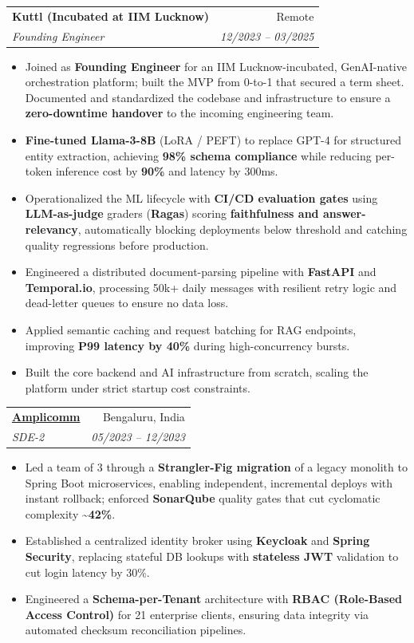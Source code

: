 \documentclass[11pt,a4paper]{article}
\makeatletter
\newcommand{\resumeItem}[1]{
  \item\small{
    {#1 \vspace{-2pt}}
  }
}
\newcommand{\resumeSubheading}[4]{
  \vspace{-1pt}\item
    \begin{tabular*}{0.97\textwidth}[t]{l@{\extracolsep{\fill}}r}
      \textbf{#1} & #2 \\
      \textit{\small#3} & \textit{\small #4} \\
    \end{tabular*}\vspace{-5pt}
}
\newcommand{\resumeItemListStart}{\begin{itemize}[itemsep=2pt, topsep=0pt, partopsep=0pt]}
\newcommand{\resumeItemListEnd}{\end{itemize}\vspace{-5pt}}
\makeatother
\begin{document}
    \resumeSubheading
      {Kuttl (Incubated at IIM Lucknow)}{Remote}
      {Founding Engineer}{12/2023 -- 03/2025}
      \resumeItemListStart
        \resumeItem{Joined as \textbf{Founding Engineer} for an IIM Lucknow-incubated, GenAI-native orchestration platform; built the MVP from 0-to-1 that secured a term sheet. Documented and standardized the codebase and infrastructure to ensure a \textbf{zero-downtime handover} to the incoming engineering team.}
        \resumeItem{\textbf{Fine-tuned Llama-3-8B} (LoRA / PEFT) to replace GPT-4 for structured entity extraction, achieving \textbf{98\% schema compliance} while reducing per-token inference cost by \textbf{90\%} and latency by 300ms.}
        \resumeItem{Operationalized the ML lifecycle with \textbf{CI/CD evaluation gates} using \textbf{LLM-as-judge} graders (\textbf{Ragas}) scoring \textbf{faithfulness and answer-relevancy}, automatically blocking deployments below threshold and catching quality regressions before production.}
        \resumeItem{Engineered a distributed document-parsing pipeline with \textbf{FastAPI} and \textbf{Temporal.io}, processing 50k+ daily messages with resilient retry logic and dead-letter queues to ensure no data loss.}
        \resumeItem{Applied semantic caching and request batching for RAG endpoints, improving \textbf{P99 latency by 40\%} during high-concurrency bursts.}
        \resumeItem{Built the core backend and AI infrastructure from scratch, scaling the platform under strict startup cost constraints.}
      \resumeItemListEnd

    \resumeSubheading
      {\href{https://amplicomm.com/}{Amplicomm}}{Bengaluru, India}
      {SDE-2}{05/2023 -- 12/2023}
      \resumeItemListStart
        \resumeItem{Led a team of 3 through a \textbf{Strangler-Fig migration} of a legacy monolith to Spring Boot microservices, enabling independent, incremental deploys with instant rollback; enforced \textbf{SonarQube} quality gates that cut cyclomatic complexity \textbf{\textasciitilde{}42\%}.}
        \resumeItem{Established a centralized identity broker using \textbf{Keycloak} and \textbf{Spring Security}, replacing stateful DB lookups with \textbf{stateless JWT} validation to cut login latency by 30\%.}
        \resumeItem{Engineered a \textbf{Schema-per-Tenant} architecture with \textbf{RBAC (Role-Based Access Control)} for 21 enterprise clients, ensuring data integrity via automated checksum reconciliation pipelines.}
      \resumeItemListEnd
\end{document}
